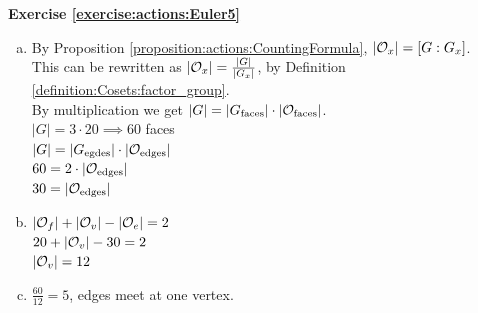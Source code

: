 \noindent\textbf{Exercise \ref{exercise:actions:Euler5}}
\begin{enumerate}[(a)]
\item
By Proposition \ref{proposition:actions:CountingFormula}, $|{\cal O}_x| = [G : G_x]$.  
\\
This can be rewritten as $|{\cal O}_x| = \frac{|G|}{|{G_x|}}$, by Definition \ref{definition:Cosets:factor_group}.
\\
By multiplication we get $|G| = |G_\text{faces}| \cdot |{\cal O}_\text{faces}|$. 
\\
$|G| = 3 \cdot 20 \implies 60$ faces
\\
$|G| = |G_\text{egdes}| \cdot |{\cal O}_\text{edges}|$
\\
$60 = 2 \cdot |{\cal O}_\text{edges}|$
\\
$30 = |{\cal O}_\text{edges}|$

\item
$|{\cal O}_f| + |{\cal O}_v| - |{\cal O}_e| = 2$
\\
$20 +  |{\cal O}_v| -30 = 2$
\\
$ |{\cal O}_v| = 12$

\item
$\frac{60}{12} = 5$, edges meet at one vertex.
\end{enumerate}
 
